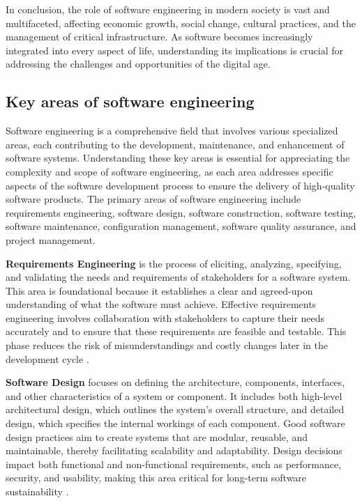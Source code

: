 \begin{refsection}
In conclusion, the role of software engineering in modern society is vast and multifaceted, affecting economic growth, social change, cultural practices, and the management of critical infrastructure. As software becomes increasingly integrated into every aspect of life, understanding its implications is crucial for addressing the challenges and opportunities of the digital age.

\subsection{Key areas of software engineering}

Software engineering is a comprehensive field that involves various specialized areas, each contributing to the development, maintenance, and enhancement of software systems. Understanding these key areas is essential for appreciating the complexity and scope of software engineering, as each area addresses specific aspects of the software development process to ensure the delivery of high-quality software products. The primary areas of software engineering include requirements engineering, software design, software construction, software testing, software maintenance, configuration management, software quality assurance, and project management.

\textbf{Requirements Engineering} is the process of eliciting, analyzing, specifying, and validating the needs and requirements of stakeholders for a software system. This area is foundational because it establishes a clear and agreed-upon understanding of what the software must achieve. Effective requirements engineering involves collaboration with stakeholders to capture their needs accurately and to ensure that these requirements are feasible and testable. This phase reduces the risk of misunderstandings and costly changes later in the development cycle \cite[pp.~41-44]{pohl2010requirements}.

\textbf{Software Design} focuses on defining the architecture, components, interfaces, and other characteristics of a system or component. It includes both high-level architectural design, which outlines the system’s overall structure, and detailed design, which specifies the internal workings of each component. Good software design practices aim to create systems that are modular, reusable, and maintainable, thereby facilitating scalability and adaptability. Design decisions impact both functional and non-functional requirements, such as performance, security, and usability, making this area critical for long-term software sustainability \cite[pp.~109-113]{bass2021software}.


\end{refsection}
